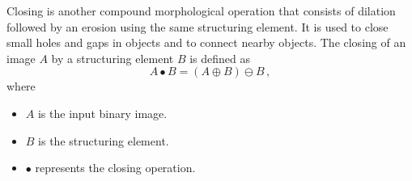 Closing is another compound morphological operation that consists of dilation followed by an erosion using the same structuring element. It is used to close small holes and gaps in objects and to connect nearby objects. The closing of an image $A$ by a structuring element $B$ is defined as
\begin{equation}
  A \bullet B = (A \oplus B) \ominus B\,,
  \label{eq:closing}
\end{equation}
where
\begin{itemize}
  \item $A$ is the input binary image.
  \item $B$ is the structuring element.
  \item $\bullet$ represents the closing operation.
\end{itemize}

